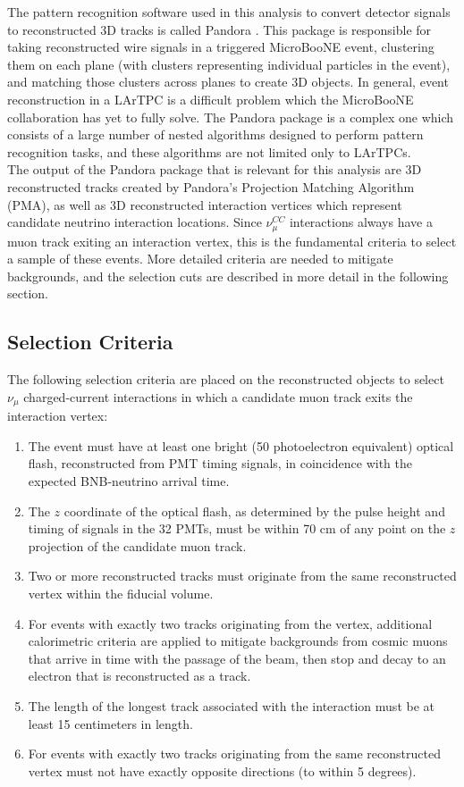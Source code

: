 The pattern recognition software used in this analysis to convert detector signals to reconstructed 3D tracks is called Pandora \cite{pandora_paper}. This package is responsible for taking reconstructed wire signals in a triggered MicroBooNE event, clustering them on each plane (with clusters representing individual particles in the event), and matching those clusters across planes to create 3D objects. In general, event reconstruction in a LArTPC is a difficult problem which the MicroBooNE collaboration has yet to fully solve. The Pandora package is a complex one which consists of a large number of nested algorithms designed to perform pattern recognition tasks, and these algorithms are not limited only to LArTPCs.\\

The output of the Pandora package that is relevant for this analysis are 3D reconstructed tracks created by Pandora's Projection Matching Algorithm (PMA), as well as 3D reconstructed interaction vertices which represent candidate neutrino interaction locations. Since $\nu_\mu^{CC}$ interactions always have a muon track exiting an interaction vertex, this is the fundamental criteria to select a sample of these events. More detailed criteria are needed to mitigate backgrounds, and the selection cuts are described in more detail in the following section.

\subsection{Selection Criteria}\label{kaon_event_selection_section}
The following selection criteria are placed on the reconstructed objects to select $\nu_\mu$ charged-current interactions in which a candidate muon track exits the interaction vertex:

\begin{enumerate}
\item The event must have at least one bright (50 photoelectron equivalent) optical flash, reconstructed from PMT timing signals, in coincidence with the expected BNB-neutrino arrival time. %
\item The $z$ coordinate of the optical flash, as determined by the pulse height and timing of signals in the 32 PMTs, must be within 70 cm of any point on the $z$ projection of the candidate muon track. %
\item Two or more reconstructed tracks must originate from the same reconstructed vertex within the fiducial volume. %
\item For events with exactly two tracks originating from the vertex, additional calorimetric criteria are applied to mitigate backgrounds from cosmic muons that arrive in time with the passage of the beam, then stop and decay to an electron that is reconstructed as a track. %
\item The length of the longest track associated with the interaction must be at least 15 centimeters in length.
\item For events with exactly two tracks originating from the same reconstructed vertex must not have exactly opposite directions (to within 5 degrees).
\end{enumerate}

